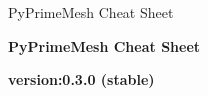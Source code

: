 \documentclass[9pt,landscape]{article}
\begin{document}
\raggedright
\footnotesize

PyPrimeMesh Cheat Sheet

\begin{center}
     \Huge{\textbf{PyPrimeMesh Cheat Sheet}} \\
\end{center}
\begin{center}
  \small{\textbf{version:0.3.0 (stable) }} \\
\end{center}
\vspace{-0.15cm}
\noindent\makebox[\linewidth]{\rule{\paperwidth}{2pt}}
\end{document}
